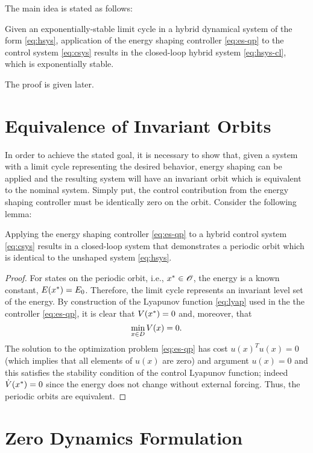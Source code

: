 \documentclass[twocolumn]{article}
\begin{document}
The main idea is stated as follows:
%
\begin{theorem}
  Given an exponentially-stable limit cycle in a hybrid dynamical system of the form \eqref{eq:hsys}, application of the energy shaping controller \eqref{eq:es-qp} to the control system \eqref{eq:csys} results in the closed-loop hybrid system \eqref{eq:hsys-cl}, which is exponentially stable.
\end{theorem}
%
The proof is given later.



\section{Equivalence of Invariant Orbits}

In order to achieve the stated goal, it is necessary to show that, given a system with a limit cycle representing the desired behavior, energy shaping can be applied and the resulting system will have an invariant orbit which is equivalent to the nominal system. Simply put, the control contribution from the energy shaping controller must be identically zero on the orbit. Consider the following lemma:

\begin{lemma}
  Applying the energy shaping controller \eqref{eq:es-qp} to a hybrid control system \eqref{eq:csys} results in a closed-loop system that demonstrates a periodic orbit which is identical to the unshaped system \eqref{eq:hsys}.
\end{lemma}

\begin{proof}
  For states on the periodic orbit, i.e., $x^{*} \in \mathscr{O}$, the energy is a known constant, $E(x^{*}) = E_{0}$.
  Therefore, the limit cycle represents an invariant level set of the energy.
  By construction of the Lyapunov function \eqref{eq:lyap} used in the the controller \eqref{eq:es-qp}, it is clear that $V(x^{*}) = 0$ and, moreover, that $$\min_{x \in D} V(x) = 0.$$
  The solution to the optimization problem \eqref{eq:es-qp} has cost $u(x)^T u(x) = 0$ (which implies that all elements of $u(x)$ are zero) and argument $u(x) = 0$ and this satisfies the stability condition of the control Lyapunov function; indeed ${\dot V}(x^{*}) = 0$ since the energy does not change without external forcing.
  Thus, the periodic orbits are equivalent.
\end{proof}

\section{Zero Dynamics Formulation}
\end{document}
